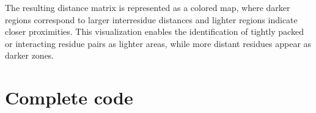 \documentclass[a4paper,10pt,english]{sphinxmanual}
\begin{document}
\begin{sphinxVerbatim}[commandchars=\\\{\}]
   
\end{sphinxVerbatim}

\noindent{}

\sphinxAtStartPar
{} The resulting distance matrix is represented as a colored map, where darker regions correspond to larger inter\sphinxhyphen{}residue distances and lighter regions indicate closer proximities. This visualization enables the identification of tightly packed or interacting residue pairs as lighter areas, while more distant residues appear as darker zones.


\section{Complete code}
\label{\detokenize{DistanceMatrix:complete-code}}
\begin{sphinxVerbatim}[commandchars=\\\{\}]
 
\end{sphinxVerbatim}

\begin{sphinxVerbatim}[commandchars=\\\{\}]
\end{sphinxVerbatim}
\end{document}
